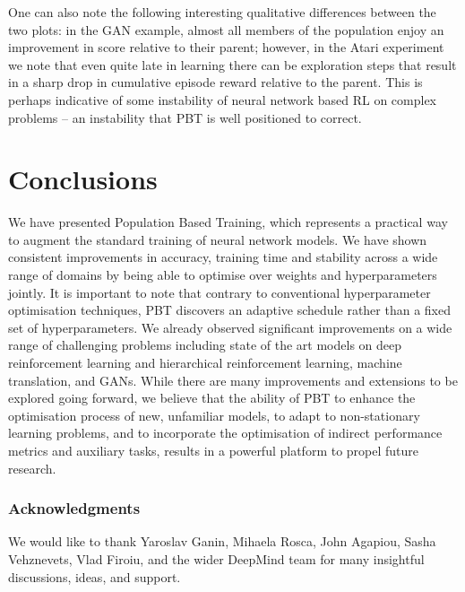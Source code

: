\documentclass{article} %
\begin{document}
One can also note the following interesting qualitative differences between the two plots: in the GAN example, almost all members of the population enjoy an improvement in score relative to their parent; however, in the Atari experiment we note that even quite late in learning there can be exploration steps that result in a sharp drop in cumulative episode reward relative to the parent. This is perhaps indicative of some instability of neural network based RL on complex problems -- an instability that PBT is well positioned to correct.





\section{Conclusions}\label{sec:conclusion}


We have presented Population Based Training, which represents a practical way to augment the standard training of neural network models. We have shown consistent improvements in accuracy, training time and stability across a wide range of domains by being able to optimise over weights and hyperparameters jointly. It is important to note that contrary to conventional hyperparameter optimisation techniques, PBT discovers an adaptive schedule rather than a fixed set of hyperparameters. We already observed significant improvements on a wide range of challenging problems including state of the art models on deep reinforcement learning and hierarchical reinforcement learning, machine translation, and GANs. While there are many improvements and extensions to be explored going forward, we believe that the ability of PBT to enhance the optimisation process of new, unfamiliar models, to adapt to non-stationary learning problems, and to incorporate the optimisation of indirect performance metrics and auxiliary tasks, results in a powerful platform to propel future research. 



\subsubsection*{Acknowledgments}
We would like to thank Yaroslav Ganin, Mihaela Rosca, John Agapiou, Sasha Vehznevets, Vlad Firoiu, and the wider DeepMind team for many insightful discussions, ideas, and support. 
\end{document}
